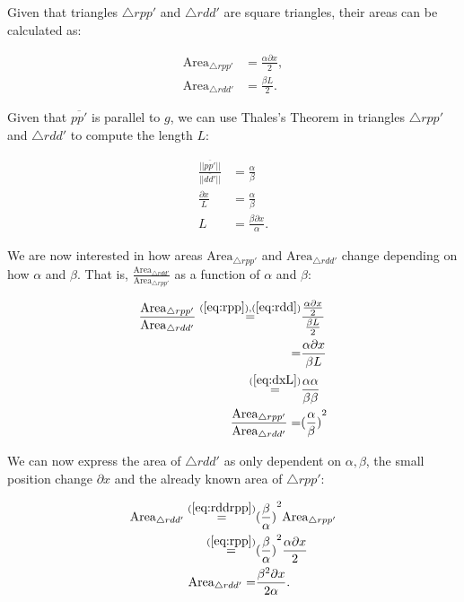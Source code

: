 Given that triangles $\triangle rpp'$ and $\triangle rdd'$ are square triangles, their areas can be calculated as:

\begin{align}
    \text{Area}_{\triangle rpp'} &= \frac{\alpha \partial x}{2}, \label{eq:rpp}\\
    \text{Area}_{\triangle rdd'} &= \frac{\beta L}{2}. \label{eq:rdd}   
\end{align}


Given that $\overline{pp'}$ is parallel to $g$, we can use Thales's Theorem in triangles $\triangle rpp'$ and $\triangle rdd'$ to compute the length $L$: 

\begin{align}
    \frac{||\overline{pp'}||}{||\overline{dd'}||} &= \frac \alpha \beta \\
    \frac{\partial x}{L} &= \frac \alpha \beta  \label{eq:dxL} \\
    L &= \frac{\beta \partial x}{\alpha}. \label{eq:L}
\end{align}



We are now interested in how areas $\text{Area}_{\triangle rpp'}$ and $\text{Area}_{\triangle rdd'}$ change depending on how $\alpha$ and $\beta$. That is, $\frac{\text{Area}_{\triangle rdd'}}{\text{Area}_{\triangle rpp'}}$ as a function of $\alpha$ and $\beta$: 

\begin{align}
    \frac{\text{Area}_{\triangle rpp'}}{\text{Area}_{\triangle rdd'}} \overset{(\ref{eq:rpp}), (\ref{eq:rdd})}{=} &\frac{\frac{\alpha \partial x}{2}}{\frac{\beta L}{2}} \\
    = &\frac{\alpha \partial x}{\beta L} \\
    \overset{(\ref{eq:dxL})}{=} &\frac{\alpha \alpha}{\beta \beta} \\
    \frac{\text{Area}_{\triangle rpp'}}{\text{Area}_{\triangle rdd'}} = &{(\frac \alpha \beta)}^2 \label{eq:rddrpp}
\end{align}

We can now express the area of $\triangle rdd'$ as only dependent on $\alpha, \beta$, the small position change $\partial x$ and the already known area of $\triangle rpp'$:

\begin{align}
    \text{Area}_{\triangle rdd'} \overset{(\ref{eq:rddrpp})}{=} &{(\frac \beta \alpha)}^2 \text{Area}_{\triangle rpp'} \\
    \overset{(\ref{eq:rpp})}{=} &{(\frac \beta \alpha)}^2 \frac{\alpha \partial x}{2} \\
    \text{Area}_{\triangle rdd'} = &\frac{\beta^2 \partial x}{2\alpha}. \label{eq:ardd}
\end{align}

